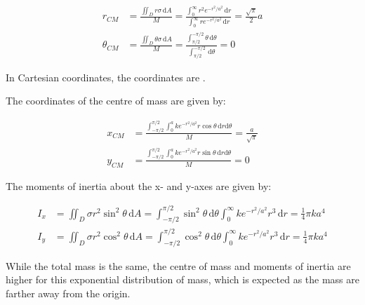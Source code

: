 \documentclass[12pt]{article}
\begin{document}
\begin{equation}
    \begin{split}
        r_{CM} &= \frac{\iint_{D} r \sigma \, \mathrm{d}A}{M} = \frac{\int_{0}^{\infty} r^{2} e^{-r^{2}/a^{2}} \, \mathrm{d}r}{\int_{0}^{\infty} r e^{-r^{2}/a^{2}} \, \mathrm{d}r} = \frac{\sqrt{\pi}}{2} a \\
        \theta_{CM} &= \frac{\iint_{D} \theta \sigma \, \mathrm{d}A}{M} = \frac{\int_{\pi/2}^{-\pi/2} \theta \, \mathrm{d}\theta}{\int_{\pi/2}^{-\pi/2} \, \mathrm{d}\theta} = 0
    \end{split}
\end{equation}

In Cartesian coordinates, the coordinates are .

\begin{correction}
    The coordinates of the centre of mass are given by:

    \begin{equation}
        \begin{split}
            x_{CM} &= \frac{\int_{-\pi/2}^{\pi/2} \int_{0}^{a} k e^{-r^{2}/a^{2}} r \cos{\theta} \, \mathrm{d}r \mathrm{d}\theta}{M} = \frac{a}{\sqrt{\pi}} \\
            y_{CM} &= \frac{\int_{-\pi/2}^{\pi/2} \int_{0}^{a} k e^{-r^{2}/a^{2}} r \sin{\theta} \, \mathrm{d}r \mathrm{d}\theta}{M} = 0
        \end{split}
    \end{equation}
\end{correction}

The moments of inertia about the x- and y-axes are given by:

\begin{equation}
    \begin{split}
        I_{x} &= \iint_{D} \sigma r^{2} \sin^{2}{\theta} \, \mathrm{d}A = \int_{-\pi/2}^{\pi/2} \sin^{2}{\theta} \, \mathrm{d}\theta \int_{0}^{\infty} k e^{-r^{2}/a^{2}} r^{3} \, \mathrm{d}r = \frac{1}{4} \pi k a^{4} \\
        I_{y} &= \iint_{D} \sigma r^{2} \cos^{2}{\theta} \, \mathrm{d}A = \int_{-\pi/2}^{\pi/2} \cos^{2}{\theta} \, \mathrm{d}\theta \int_{0}^{\infty} k e^{-r^{2}/a^{2}} r^{3} \, \mathrm{d}r = \frac{1}{4} \pi k a^{4}
    \end{split}
\end{equation}

While the total mass is the same, the centre of mass and moments of inertia are higher for this exponential distribution of mass, which is expected as the mass are farther away from the origin.
\end{document}
